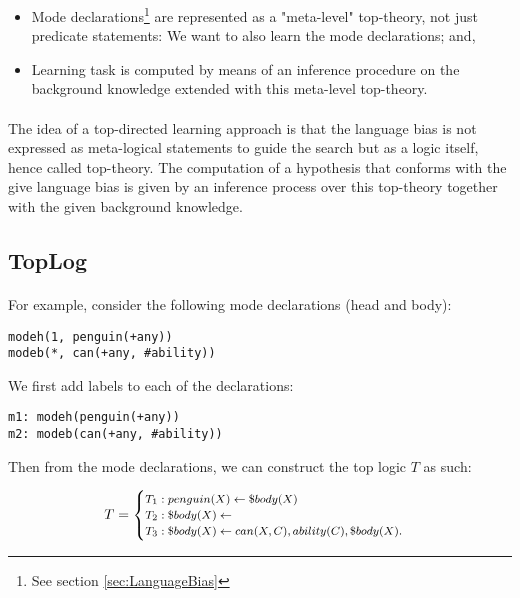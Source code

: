 \documentclass{article}
\theoremstyle{plain}
\theoremstyle{definition}
\begin{document}
\begin{multicols}{2}
\begin{itemize}
\item Mode declarations\footnote{See section \ref{sec:LanguageBias}} are represented as a "meta-level" top-theory, not just predicate statements: We want to also learn the mode declarations; and,
\item Learning task is computed by means of an inference procedure on the background knowledge extended with this meta-level top-theory.
\end{itemize}

\paragraph{} The idea of a top-directed learning approach is that the language bias is not expressed as meta-logical statements to guide the search but as a logic itself, hence called top-theory. The computation of a hypothesis that conforms with the give language bias is given by an inference process over this top-theory together with the given background knowledge.

\subsection{TopLog}

\paragraph{} For example, consider the following mode declarations (head and body):

\begin{lstlisting}
modeh(1, penguin(+any))
modeb(*, can(+any, #ability))
\end{lstlisting}

\noindent We first add labels to each of the declarations:

\begin{lstlisting}
m1: modeh(penguin(+any))
m2: modeb(can(+any, #ability))
\end{lstlisting}

\noindent Then from the mode declarations, we can construct the top logic $T$ as such:

\[\footnotesize
T = \begin{cases}
T_1: penguin(X) \leftarrow \$body(X)\\
T_2: \$body(X) \leftarrow\\
T_3: \$body(X) \leftarrow can(X, C), ability(C), \$body(X).
\end{cases}
\]


\end{multicols}
\end{document}
